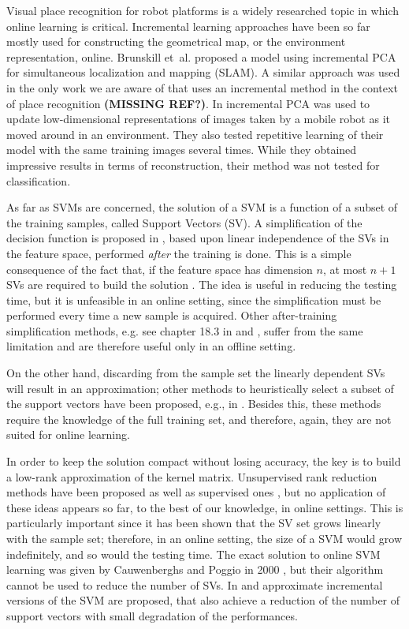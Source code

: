 Visual place recognition for robot platforms is a widely researched
topic in which online learning is critical. Incremental learning
approaches have been so far mostly used for constructing the
geometrical map, or the environment representation, online. Brunskill
et~al. \cite{emma:irca05} proposed a model using incremental PCA for
simultaneous localization and mapping (SLAM). A similar approach was
used in the only work we are aware of that uses an incremental method
in the context of place recognition \textbf{(MISSING REF?)}. In \cite{ljubjiana:icra02}
incremental PCA was used to update low-dimensional representations of
images taken by a mobile robot as it moved around in an
environment. They also tested repetitive learning of their model with
the same training images several times. While they obtained impressive
results in terms of reconstruction, their method was not tested for
classification.

As far as SVMs are concerned, the solution of a SVM is a function of
a subset of the training samples, called Support Vectors (SV). A
simplification of the decision function is proposed in
\cite{DownsGM01}, based upon linear independence of the SVs in the
feature space, performed \emph{after} the training is done. This is a
simple consequence of the fact that, if the feature space has
dimension $n$, at most $n+1$ SVs are required to build the
solution \cite{PontilV98}. The idea is useful in reducing the testing
time, but it is unfeasible in an online setting, since the
simplification must be performed every time a new sample is
acquired. Other after-training simplification methods, e.g. see
chapter 18.3 in \cite{SmolaS02} and \cite{nguyen2005}, suffer
from the same limitation and are therefore useful only in an offline
setting.

On the other hand, discarding from the sample set the linearly
dependent SVs will result in an approximation; other methods to
heuristically select a subset of the support vectors have been
proposed, e.g., in \cite{LeeM01,schoel06,KeerthiCDC06}. Besides this,
these methods require the knowledge of the full training set, and
therefore, again, they are not suited for online learning.

In order to keep the solution compact without losing accuracy, the key
is to build a low-rank approximation of the kernel
matrix. Unsupervised rank reduction methods have been proposed
\cite{Baudat03} as well as supervised ones \cite{BachJordan2005}, but
no application of these ideas appears so far, to the best of our
knowledge, in online settings. This is particularly important since it
has been shown \cite{Steinwart03} that the SV set grows linearly with
the sample set; therefore, in an online setting, the size of a SVM
would grow indefinitely, and so would the testing time. The exact
solution to online SVM learning was given by Cauwenberghs and Poggio
in 2000 \cite{CauwenberghsP00}, but their algorithm cannot be used to
reduce the number of SVs. In \cite{syed99incremental} and
\cite{pronobis:icvs06} approximate incremental
versions of the SVM are proposed, that also achieve a reduction of the
number of support vectors with small degradation of the performances.
